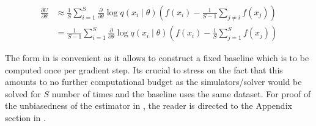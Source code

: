 \begin{align}
        \frac{\partial U}{\partial \theta} &\approx \frac{1}{S} \sum_{i=1}^{S}  \frac{\partial}{\partial \theta} \log q\left(x_i \mid \theta\right) \left(f(x_i)-\frac{1}{S-1} \sum_{j\neq i}f(x_j)\right)\\
        &= \frac{1}{S-1} \sum_{i=1}^{S}  \frac{\partial}{\partial \theta} \log q\left(x_i \mid \theta\right) \left(f(x_i)-\frac{1}{S} \sum_{j=1}^{S}f(x_j)\right) \label{eq:baseline_trick}
\end{align}

The form in  is convenient as it allows to construct a fixed baseline which is to be computed once per gradient step. Its crucial to stress on the fact that this amounts to no further computational budget as the simulators/solver would be solved for $S$ number of times and the baseline uses the same dataset. For proof of the unbiasedness of the estimator in , the reader is directed to the Appendix section in \cite{kool_buy_2022}.



